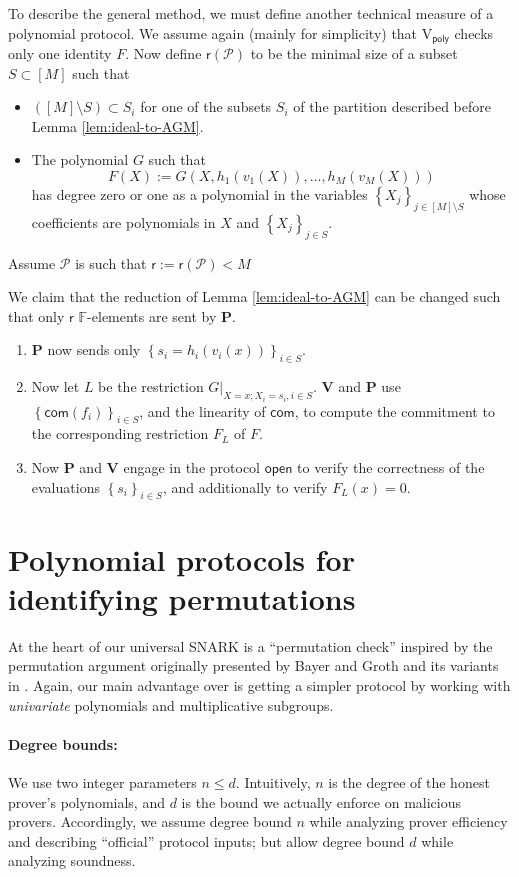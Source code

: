 \documentclass[11pt]{article} %
\newcommand{\F}{\ensuremath{\mathbb F}\xspace}
\newcommand{\com}{\ensuremath{\mathsf{com}}\xspace}
\newcommand{\open}{\ensuremath{\mathsf{open}}\xspace}
\newcommand{\reducedelems}{\ensuremath{\mathsf{r}}\xspace}
\newcommand{\defeq}{:=}
\newcommand{\sett}[2]{\ensuremath{\set{#1}_{#2}}\xspace}
\newcommand{\prv}{\ensuremath{\mathsf{\mathbf{P}}}\xspace}
\newcommand{\verpoly}{\ensuremath{\mathrm{V_{\mathsf{poly}}}}\xspace}
\newcommand{\ver}{\ensuremath{\mathsf{\mathbf{V}}}\xspace}
\newcommand{\set}[1]{\ensuremath{\left\{#1\right\}}\xspace}
\newcommand{\prot}{\ensuremath{\mathscr{P}}\xspace}
\begin{document}
To describe the general method, we must define another technical measure of a polynomial protocol. We assume again (mainly for simplicity) that \verpoly checks only one identity $F$.
Now define $\reducedelems(\prot)$ to be the minimal size of a subset $S\subset [M]$ such that 
\begin{itemize}
 \item $([M]\setminus S)\subset S_i$ for one of the subsets $S_i$ of the partition described before Lemma \ref{lem:ideal-to-AGM}.
 \item The polynomial $G$ such that
 \[F(X)\defeq G(X, h_1(v_1(X)),\ldots,h_{M}(v_{M}(X)))\]
has degree zero or one as a polynomial in the variables \sett{X_j}{j\in [M]\setminus S} whose coefficients are polynomials in $X$ and \sett{X_j}{j\in S}. 
\end{itemize}
Assume \prot is such that $\reducedelems \defeq \reducedelems(\prot)<M$

We claim that the reduction of Lemma \ref{lem:ideal-to-AGM} can be changed such that only $\reducedelems$ $\F$-elements are sent by \prv.
\begin{enumerate}
 \item \prv now sends only \sett{s_i=h_i(v_i(x))}{i\in S}.
 \item Now let $L$ be the restriction $G|_{X=x;X_i=s_i, i\in S}$. \ver and \prv use \sett{\com(f_i)}{i\in S}, and the linearity of \com, to compute the commitment to the corresponding restriction $F_L$ of $F$.
 \item Now \prv and \ver engage in the protocol \open to verify the correctness of the evaluations $\sett{s_i}{i\in S}$, and additionally to verify $F_L(x)=0$.
 
\end{enumerate}


 


\section{Polynomial protocols for identifying permutations}\label{sec:permprotocol}
At the heart of our universal SNARK is a ``permutation check'' inspired by the permutation argument originally presented by Bayer and Groth \cite{permorig} and its variants in \cite{Bootle,sonic}. Again, our main advantage over \cite{sonic} is getting a simpler protocol by working with \emph{univariate} polynomials and multiplicative subgroups.


\paragraph{Degree bounds:}
 We use two integer parameters $n\leq d$. Intuitively, $n$ is the degree of the honest prover's polynomials, and $d$ is the bound we actually enforce on malicious provers. Accordingly, we assume degree bound $n$ while analyzing prover efficiency and describing ``official'' protocol inputs; but allow degree bound $d$ while analyzing soundness.
\end{document}

